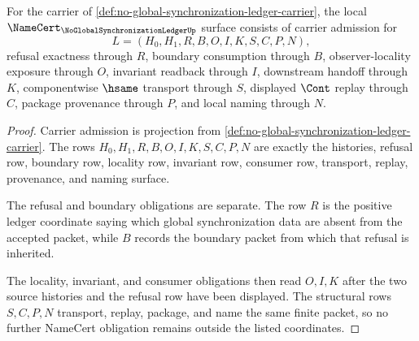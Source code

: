 \begin{theorem}
\label{thm:no-global-synchronization-ledger-namecert-obligations}
For the carrier of \autoref{def:no-global-synchronization-ledger-carrier}, the local $\NameCert_{\NoGlobalSynchronizationLedgerUp}$ surface consists of carrier admission for
$$
L=(H_0,H_1,R,B,O,I,K,S,C,P,N),
$$
refusal exactness through $R$, boundary consumption through $B$, observer-locality exposure through $O$, invariant readback through $I$, downstream handoff through $K$, componentwise $\hsame$ transport through $S$, displayed $\Cont$ replay through $C$, package provenance through $P$, and local naming through $N$.
\end{theorem}
\begin{proof}
Carrier admission is projection from \autoref{def:no-global-synchronization-ledger-carrier}. The rows $H_0,H_1,R,B,O,I,K,S,C,P,N$ are exactly the histories, refusal row, boundary row, locality row, invariant row, consumer row, transport, replay, provenance, and naming surface.

The refusal and boundary obligations are separate. The row $R$ is the positive ledger coordinate saying which global synchronization data are absent from the accepted packet, while $B$ records the boundary packet from which that refusal is inherited.

The locality, invariant, and consumer obligations then read $O,I,K$ after the two source histories and the refusal row have been displayed. The structural rows $S,C,P,N$ transport, replay, package, and name the same finite packet, so no further NameCert obligation remains outside the listed coordinates.
\end{proof}

